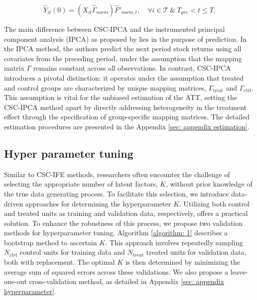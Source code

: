 \documentclass[12pt]{article}
\begin{document}
\begin{equation}
\hat{Y}_{it}(0) = (X_{it} \hat{\Gamma}_{norm}) \hat{F}'_{norm, t}, \quad \forall i \in \mathcal{T} \ \& \ T_{pre} < t \leq T.
\end{equation}

The main difference between CSC-IPCA and the instrumented principal component analysis (IPCA) as proposed by \cite{kelly2020instrumented} lies in the purpose of prediction. In the IPCA method, the authors predict the next period stock returns using all covariates from the preceding period, under the assumption that the mapping matrix $\Gamma$ remains constant across all observations. In contrast, CSC-IPCA introduces a pivotal distinction: it operates under the assumption that treated and control groups are characterized by unique mapping matrices, $\Gamma_{\text{treat}}$ and $\Gamma_{\text{ctrl}}$. This assumption is vital for the unbiased estimation of the ATT, setting the CSC-IPCA method apart by directly addressing heterogeneity in the treatment effect through the specification of group-specific mapping matrices. The detailed estimation procedures are presented in the Appendix \ref{sec: appendix estimation}.

\subsection{Hyper parameter tuning} 
\label{sec: hyperparameter}
Similar to CSC-IFE methods, researchers often encounter the challenge of selecting the appropriate number of latent factors, $K$, without prior knowledge of the true data generating process. To facilitate this selection, we introduce data-driven approaches for determining the hyperparameter $K$. Utilizing both control and treated units as training and validation data, respectively, offers a practical solution. To enhance the robustness of this process, we propose two validation methods for hyperparameter tuning. Algorithm \ref{algorithm: 1} describes a bootstrap method to ascertain $K$. This approach involves repeatedly sampling $N_{ctrl}$ control units for training data and $N_{treat}$ treated units for validation data, both with replacement. The optimal $K$ is then determined by minimizing the average sum of squared errors across these validations. We also propose a leave-one-out cross-validation method, as detailed in Appendix \ref{sec: appendix hyperparameter}.
\end{document}
